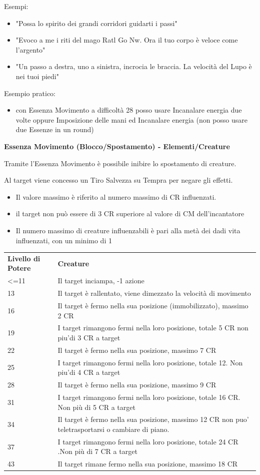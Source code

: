 \documentclass[a4paper,11pt,twoside,openany]{book}
\begin{document}
\bigskip

Esempi:
\begin{itemize}
	\item
	      "Possa lo spirito dei grandi corridori guidarti i passi"
	\item
	      "Evoco a me i riti del mago Ratl Go Nw. Ora il tuo corpo è veloce come l'argento"
	\item
	      "Un passo a destra, uno a sinistra, incrocia le braccia. La velocità del Lupo è nei tuoi piedi"
\end{itemize}
Esempio pratico:
\begin{itemize}
	\item
	      con Essenza Movimento a difficoltà 28 posso usare Incanalare energia due volte oppure Imposizione delle mani ed Incanalare energia (non posso usare due Essenze in un round)
\end{itemize}

\bigskip

\textbf{Essenza Movimento (Blocco/Spostamento) - Elementi/Creature}

Tramite l'Essenza Movimento è possibile inibire lo spostamento di creature.

Al target viene concesso un Tiro Salvezza su Tempra per negare gli effetti.
\begin{itemize}
	\item
	      Il valore massimo è riferito al numero massimo di CR influenzati.
	\item
	      il target non può essere di 3 CR superiore al valore di CM dell'incantatore
	\item
	      Il numero massimo di creature influenzabili è pari alla metà dei dadi vita influenzati, con un minimo di 1
\end{itemize}

\bigskip

\begin{tabularx}{\textwidth}{lX}
	\toprule
	\textbf{Livello di Potere} & \textbf{Creature}\tabularnewline
	\textless=11   & Il target inciampa, -1 azione\tabularnewline
	13       & Il target è rallentato, viene dimezzato la velocità di movimento\tabularnewline
	16       & Il target è fermo nella sua posizione (immobilizzato), massimo 2	CR\tabularnewline
	19       & I target rimangono fermi nella loro posizione, totale 5 CR non piu'di 3 CR a target\tabularnewline
	22       & Il target è fermo nella sua posizione, massimo 7 CR\tabularnewline
	25       & I target rimangono fermi nella loro posizione, totale 12. Non piu'di 4 CR a target\tabularnewline
	28      & Il target è fermo nella sua posizione, massimo 9 CR\tabularnewline
	31      & I target rimangono fermi nella loro posizione, totale 16 CR. Non più di 5 CR a target\tabularnewline
	34       & Il target è fermo nella sua posizione, massimo 12 CR non puo' teletrasportarsi o cambiare di piano.\tabularnewline
	37       & I target rimangono fermi nella loro posizione, totale 24 CR .Non più di 7 CR a target\tabularnewline
	43      & Il target rimane fermo nella sua posizione, massimo 18 CR\tabularnewline
\end{tabularx}
\end{document}
